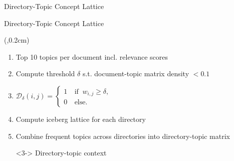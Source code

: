 \begin{frame}{Directory-Topic Concept Lattice}
  

\end{frame}



\begin{frame}{Directory-Topic Concept Lattice}
    \begin{textblock*}{3.8cm}(\paperwidth-3.9cm,0.2cm) %
        \only<1>{
            
        }
    \end{textblock*}

    \begin{enumerate}
        \item Top 10 topics per document incl. relevance scores
        \item Compute threshold $\delta$ s.t. document-topic matrix density $< 0.1$
        \item $\mathcal{D}_\delta(i,j)=\left\{ \begin{array}{cl}
                        1 & \ \text{if } \ w_{i,j} \geq \delta, \\
                        0 & \ \text{else.}
                    \end{array} \right.$
        \item Compute iceberg lattice for each directory
        \item <2-> Combine frequent topics across directories into directory-topic matrix
        \item[\rightarrowfill] <3-> Directory-topic context
    \end{enumerate}



\end{frame}
